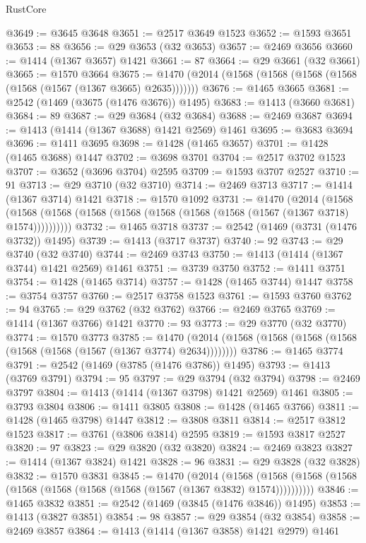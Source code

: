 \begin{lexlean}{RustCore}
\begin{coremodule}
@3649 := @3645 @3648
@3651 := @2517 @3649 @1523
@3652 := @1593 @3651
@3653 := 88
@3656 := @29 @3653 (@32 @3653)
@3657 := @2469 @3656
@3660 := @1414 (@1367 @3657) @1421
@3661 := 87
@3664 := @29 @3661 (@32 @3661)
@3665 := @1570 @3664
@3675 := @1470 (@2014 (@1568 (@1568 (@1568 (@1568 (@1568 (@1567 (@1367 @3665) @2635)))))))
@3676 := @1465 @3665
@3681 := @2542 (@1469 (@3675 (@1476 @3676)) @1495)
@3683 := @1413 (@3660 @3681)
@3684 := 89
@3687 := @29 @3684 (@32 @3684)
@3688 := @2469 @3687
@3694 := @1413 (@1414 (@1367 @3688) @1421 @2569) @1461
@3695 := @3683 @3694
@3696 := @1411 @3695
@3698 := @1428 (@1465 @3657)
@3701 := @1428 (@1465 @3688) @1447
@3702 := @3698 @3701
@3704 := @2517 @3702 @1523
@3707 := @3652 (@3696 @3704) @2595
@3709 := @1593 @3707 @2527
@3710 := 91
@3713 := @29 @3710 (@32 @3710)
@3714 := @2469 @3713
@3717 := @1414 (@1367 @3714) @1421
@3718 := @1570 @1092
@3731 := @1470
    (@2014
      (@1568 (@1568 (@1568 (@1568 (@1568 (@1568 (@1568 (@1568 (@1567 (@1367 @3718) @1574))))))))))
@3732 := @1465 @3718
@3737 := @2542 (@1469 (@3731 (@1476 @3732)) @1495)
@3739 := @1413 (@3717 @3737)
@3740 := 92
@3743 := @29 @3740 (@32 @3740)
@3744 := @2469 @3743
@3750 := @1413 (@1414 (@1367 @3744) @1421 @2569) @1461
@3751 := @3739 @3750
@3752 := @1411 @3751
@3754 := @1428 (@1465 @3714)
@3757 := @1428 (@1465 @3744) @1447
@3758 := @3754 @3757
@3760 := @2517 @3758 @1523
@3761 := @1593 @3760
@3762 := 94
@3765 := @29 @3762 (@32 @3762)
@3766 := @2469 @3765
@3769 := @1414 (@1367 @3766) @1421
@3770 := 93
@3773 := @29 @3770 (@32 @3770)
@3774 := @1570 @3773
@3785 := @1470 (@2014 (@1568 (@1568 (@1568 (@1568 (@1568 (@1568 (@1567 (@1367 @3774) @2634))))))))
@3786 := @1465 @3774
@3791 := @2542 (@1469 (@3785 (@1476 @3786)) @1495)
@3793 := @1413 (@3769 @3791)
@3794 := 95
@3797 := @29 @3794 (@32 @3794)
@3798 := @2469 @3797
@3804 := @1413 (@1414 (@1367 @3798) @1421 @2569) @1461
@3805 := @3793 @3804
@3806 := @1411 @3805
@3808 := @1428 (@1465 @3766)
@3811 := @1428 (@1465 @3798) @1447
@3812 := @3808 @3811
@3814 := @2517 @3812 @1523
@3817 := @3761 (@3806 @3814) @2595
@3819 := @1593 @3817 @2527
@3820 := 97
@3823 := @29 @3820 (@32 @3820)
@3824 := @2469 @3823
@3827 := @1414 (@1367 @3824) @1421
@3828 := 96
@3831 := @29 @3828 (@32 @3828)
@3832 := @1570 @3831
@3845 := @1470
    (@2014
      (@1568 (@1568 (@1568 (@1568 (@1568 (@1568 (@1568 (@1568 (@1567 (@1367 @3832) @1574))))))))))
@3846 := @1465 @3832
@3851 := @2542 (@1469 (@3845 (@1476 @3846)) @1495)
@3853 := @1413 (@3827 @3851)
@3854 := 98
@3857 := @29 @3854 (@32 @3854)
@3858 := @2469 @3857
@3864 := @1413 (@1414 (@1367 @3858) @1421 @2979) @1461

\end{coremodule}
\end{lexlean}
